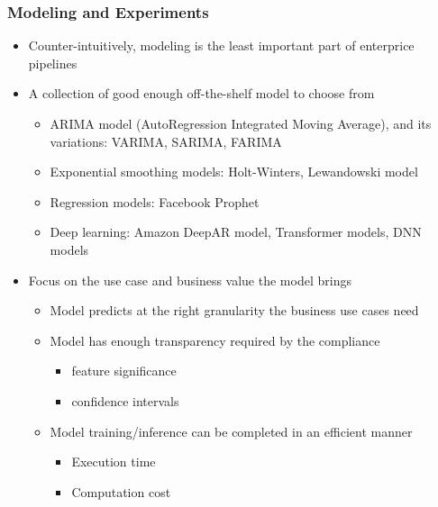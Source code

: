 \documentclass[aspectratio=169,xcolor=x11names,table]{beamer}
\begin{document}
\begin{frame}
	\frametitle{Modeling and Experiments}
	\begin{itemize}
		\item<1> Counter-intuitively, modeling is the least important part of enterprice pipelines
		\item<1> A collection of good enough off-the-shelf model to choose from
			\begin{itemize}
				\item ARIMA model (AutoRegression Integrated Moving Average), and its variations: VARIMA, SARIMA, FARIMA
				\item Exponential smoothing models: Holt-Winters, Lewandowski model
				\item Regression models: Facebook Prophet
				\item Deep learning: Amazon DeepAR model, Transformer models, DNN models
			\end{itemize}
			\vspace{3mm}
		\item<2> Focus on the use case and business value the model brings
			\begin{itemize}
				\item Model predicts at the right granularity the business use cases need
				\item Model has enough transparency required by the compliance 
					\begin{itemize}
						\item feature significance
						\item confidence intervals
					\end{itemize}
				\item Model training/inference can be completed in an efficient manner 
					\begin{itemize}
						\item Execution time
						\item Computation cost
					\end{itemize}
			\end{itemize}
	\end{itemize}
\end{frame}
\end{document}

